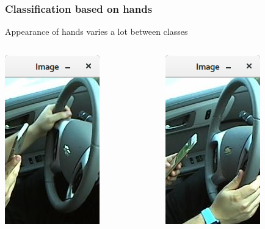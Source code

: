 \documentclass{beamer}
\begin{document}
	\begin{frame}
		\frametitle{Classification based on hands}
		Appearance of hands varies a lot between classes
		\begin{columns}
			\begin{column}{0.5\textwidth}
				\begin{center}
					\includegraphics[height=0.5\textheight]{handpose_example1}\\			
				\end{center}
			\end{column}
			\begin{column}{0.5\textwidth}
				\begin{center}
					\includegraphics[height=0.5\textheight]{handpose_example2}\\			
				\end{center}
			\end{column}
		\end{columns}		
	\end{frame}
	
\end{document}
